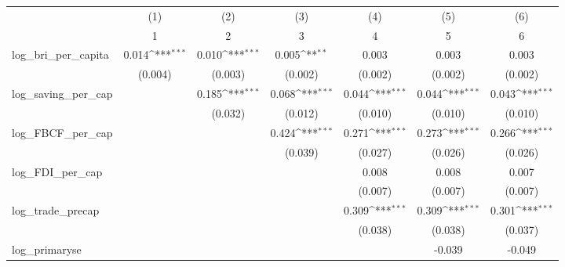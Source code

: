 {
\def\sym#1{\ifmmode^{#1}\else\(^{#1}\)\fi}
\begin{tabular}{l*{6}{c}}
\toprule
            &\multicolumn{1}{c}{(1)}&\multicolumn{1}{c}{(2)}&\multicolumn{1}{c}{(3)}&\multicolumn{1}{c}{(4)}&\multicolumn{1}{c}{(5)}&\multicolumn{1}{c}{(6)}\\
            &\multicolumn{1}{c}{1}&\multicolumn{1}{c}{2}&\multicolumn{1}{c}{3}&\multicolumn{1}{c}{4}&\multicolumn{1}{c}{5}&\multicolumn{1}{c}{6}\\
\midrule
log\_bri\_per\_capita&       0.014\sym{***}&       0.010\sym{***}&       0.005\sym{**} &       0.003         &       0.003         &       0.003         \\
            &     (0.004)         &     (0.003)         &     (0.002)         &     (0.002)         &     (0.002)         &     (0.002)         \\
\addlinespace
log\_saving\_per\_cap&                     &       0.185\sym{***}&       0.068\sym{***}&       0.044\sym{***}&       0.044\sym{***}&       0.043\sym{***}\\
            &                     &     (0.032)         &     (0.012)         &     (0.010)         &     (0.010)         &     (0.010)         \\
\addlinespace
log\_FBCF\_per\_cap&                     &                     &       0.424\sym{***}&       0.271\sym{***}&       0.273\sym{***}&       0.266\sym{***}\\
            &                     &                     &     (0.039)         &     (0.027)         &     (0.026)         &     (0.026)         \\
\addlinespace
log\_FDI\_per\_cap&                     &                     &                     &       0.008         &       0.008         &       0.007         \\
            &                     &                     &                     &     (0.007)         &     (0.007)         &     (0.007)         \\
\addlinespace
log\_trade\_precap&                     &                     &                     &       0.309\sym{***}&       0.309\sym{***}&       0.301\sym{***}\\
            &                     &                     &                     &     (0.038)         &     (0.038)         &     (0.037)         \\
\addlinespace
log\_primaryse&                     &                     &                     &                     &      -0.039         &      -0.049         \\

\end{tabular}}
